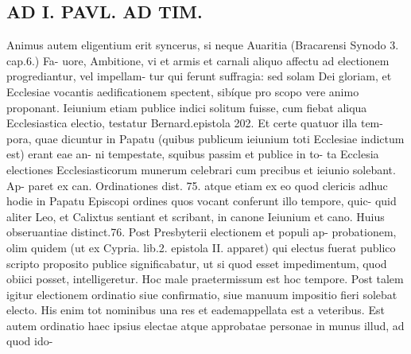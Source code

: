 \documentclass{article}
\begin{document}
\begin{pages}
\section*{AD I. PAVL. AD TIM. }
\marginpar{[ p.338 ]}Animus autem eligentium erit syncerus, si neque Auaritia (Bracarensi Synodo 3. cap.6.) Fa- uore, Ambitione, vi et armis et carnali aliquo affectu ad electionem progrediantur, vel impellam- tur qui ferunt suffragia: sed solam Dei gloriam, et Ecclesiae vocantis aedificationem spectent, sibíque pro scopo vere animo proponant. Ieiunium etiam publice indici solitum fuisse, cum fiebat aliqua Ecclesiastica electio, testatur Bernard.epistola 202. Et certe quatuor illa tem- pora, quae dicuntur in Papatu (quibus publicum ieiunium toti Ecclesiae indictum est) erant eae an- ni tempestate, squibus passim et publice in to- ta Ecclesia electiones Ecclesiasticorum munerum celebrari cum precibus et ieiunio solebant. Ap- paret ex can. Ordinationes dist. 75. atque etiam ex eo quod clericis adhuc hodie in Papatu Episcopi ordines quos vocant conferunt illo tempore, quic- quid aliter Leo, et Calixtus sentiant et scribant, in canone Ieiunium et cano. Huius obseruantiae distinct.76. Post Presbyterii electionem et populi ap- probationem, olim quidem (ut ex Cypria. lib.2. epistola II. apparet) qui electus fuerat publico scripto proposito publice significabatur, ut si quod esset impedimentum, quod obiici posset, intelligeretur. Hoc male praetermissum est hoc tempore. Post talem igitur electionem ordinatio siue confirmatio, siue manuum impositio fieri solebat electo. His enim tot nominibus una res et eademappellata est a veteribus. Est autem ordinatio haec ipsius electae atque approbatae personae in munus illud, ad quod ido- 

\end{pages}
\end{document}
